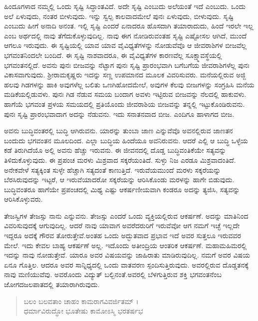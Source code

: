 ಹಿಂದೂಗಳಾದ ನಮ್ಮಲ್ಲಿ ಒಂದು ಸೃಷ್ಟಿ ಸಿದ್ಧಾಂತವಿದೆ. ಅದೇ ಸೃಷ್ಟಿ ಎಂಬುದು ಅಲೆಯಂತೆ ಇದೆ ಎಂಬುದು. ಒಂದು ಅಲೆ ಏಳುವುದು, ನಂತರ ಬೀಳುವುದು. ಇನ್ನು ಸ್ವಲ್ಪ ಕಾಲವಾದಮೇಲೆ ಪುನಃ ಏಳುವುದು, ಬೀಳುವುದು. ಸೃಷ್ಟಿ ಎಂಬುದು ಹೀಗೆ ಅನಾದಿ ಅನಂತ. ಇಲ್ಲಿ ಸೃಷ್ಟಿ ಎಂದರೆ ಏನಾದರೂ ಹೊಸದಾಗಿ ತಯಾರಾದುದು, ಹಿಂದೆ ಇರಲೇ ಇಲ್ಲ ಎಂಬ ಅರ್ಥದಲ್ಲಿ ನಾವು ತೆಗೆದುಕೊಳ್ಳುವುದಿಲ್ಲ. ನಾವು ಈಗ ನೋಡಿರುವಂತಹ ಸೃಷ್ಟಿ ಎಷ್ಟೋಸಲ ಆಗಿದೆ, ಮುಂದೆ ಆಗಲೂ ಇರುವುದು. ಈ ಸೃಷ್ಟಿಯಲ್ಲಿ ಯಾವ ಯಾವ ವೈವಿಧ್ಯತೆಗಳನ್ನು ನೋಡುವೆವೊ ಆ ಜೀವರಾಶಿಗಳ ಬೀಜವೆಲ್ಲ ಭಗವಂತನಿಂದಲೇ ಬಂದಿದೆ. ಈ ಸೃಷ್ಟಿ ನಾಶವಾದರೂ, ಈ ವೈವಿಧ್ಯತೆಗಳ ಕಾರಣವೆಲ್ಲ ಸೂಕ್ಷ್ಮಾವಸ್ಥೆಯಲ್ಲಿ ಭಗವಂತನಲ್ಲಿದೆ. ಅವನು ಪುನಃ ಬೀಜವನ್ನು ನೆಟ್ಟಾಗ ಪುನಃ ಸೃಷ್ಟಿ ಪ್ರಾರಂಭವಾಗಿ ಬಗೆಬಗೆಯ ಜೀವರಾಶಿಗಳೆಲ್ಲ ಪುನಃ ವಿಕಾಸವಾಗುವುದು. ಶ್ರೀರಾಮಕೃಷ್ಣರು ಇದನ್ನು ಸಣ್ಣ ಉಪಮಾನದ ಮೂಲಕ ವಿವರಿಸುವರು. ಮನೆಯಲ್ಲಿರುವ ಅಜ್ಜಿ ಹಲವು ಗಿಡಗಳನ್ನು ಹಾಕಿ ಅವುಗಳೆಲ್ಲ ಬಲಿತು ಒಣಗಿಹೋದಮೇಲೆ, ಅವುಗಳ ಕೆಲವು ಬೀಜಗಳನ್ನು ಸಂಗ್ರಹಿಸಿ ಮನೆಯ ಮಡಿಕೆಯಲ್ಲಿಡುವಳು. ಪುನಃ ಗಿಡ ನೆಡುವ ಸಮಯ ಬಂದಾಗ ಅವಳು ಇಟ್ಟಿರುವ ಬೀಜವನ್ನು ನೆಲದಲ್ಲಿ ಹಾಕುವಳು. ಹಾಗೆಯೆ ಭಗವಂತ ಪ್ರಳಯ ಸಮಯದಲ್ಲಿ ಪ್ರತಿಯೊಂದು ಜೀವರಾಶಿಯ ಬೀಜವನ್ನು ತನ್ನಲ್ಲಿ ಇಟ್ಟುಕೊಂಡಿರುವನು. ಪುನಃ ಸೃಷ್ಟಿ ಪ್ರಾರಂಭವಾದಾಗ ಅದನ್ನು ನೆಡುವನು. ಇದು ಸನಾತನವಾದ ಬೀಜ. ಎಂದಿಗೂ ಹಾಳಾಗದ ಬೀಜ.

ಅವನು ಬುದ್ಧಿವಂತರಲ್ಲಿ ಬುದ್ಧಿ ಆಗಿರುವನು. ಯಾರನ್ನು ತುಂಬಾ ಜಾಣ ಎನ್ನುವೆವೊ ಅವನಲ್ಲಿರುವ ಜಾಣತನ ಬಂದುದು ಭಗವಂತನ ಮೂಲದಿಂದ. ಎಲ್ಲಾ ಬುದ್ಧಿಯ ಹಿಂದೆಯೂ ಅವನಿರುವನು. ಆದರೆ ಎಲ್ಲಿ ಆ ಬುದ್ಧಿ ಒಳ್ಳೆಯ ಕಡೆ ತಿರುಗಿದೆಯೊ ಅಲ್ಲಿ ಅವನು ಹೆಚ್ಚು ಇರುವನು. ಈ ಜೀವನದಲ್ಲಿ ದೊಡ್ಡ ಬುದ್ಧಿವಂತಿಕೆಯೇ ಸತ್ಯವನ್ನು ತಿಳಿದುಕೊಳ್ಳುವುದು. ಈ ಪ್ರಪಂಚ ಮರಳು ಮಿಶ್ರವಾದ ಸಕ್ಕರೆಯಂತಿದೆ. ಸುಳ್ಳು ನಿಜ ಎರಡೂ ಮಿಶ್ರವಾದಂತಿದೆ. ಅನೇಕವೇಳೆ ಸತ್ಯಕ್ಕಿಂತ ಸುಳ್ಳೇ ಹೆಚ್ಚಾಗಿ ಸತ್ಯದಂತೆ ಕಾಣುತ್ತಿದೆ. ಇರುವೆಯಮುಂದೆ ಮರಳು ಸಕ್ಕರೆಯನ್ನು ಬೆರಸಿರುವುದನ್ನು ಇಟ್ಟರೆ, ಆ ಇರುವೆಯಾದರೋ ಸಕ್ಕರೆಯನ್ನು ಆರಿಸಿಕೊಂಡು ಮರಳನ್ನು ಹಾಗೇ ಬಿಡುವುದು. ಬುದ್ಧಿವಂತರೂ ಹಾಗೆಯೇ ಪ್ರಪಂಚದಲ್ಲಿ ಮಿಥ್ಯ ಎಷ್ಟು ಆಕರ್ಷಣೀಯವಾಗಿ ಕಂಡರೂ ಅದನ್ನು ತ್ಯಜಿಸಿ, ಸತ್ಯವನ್ನು ಆರಿಸಿಕೊಳ್ಳುವರು.

ತೇಜಸ್ವಿಗಳ ತೇಜಸ್ಸು ನಾನು ಎನ್ನುವನು. ತೇಜಸ್ಸು ಎಂದರೆ ಒಂದು ವ್ಯಕ್ತಿಯಲ್ಲಿರುವ ಆಕರ್ಷಣೆ. ಅದನ್ನು ಮಾತಿನಿಂದ ವಿವರಿಸುವುದಕ್ಕೆ ಆಗುವುದಿಲ್ಲ. ಆದರೆ ನಾವು ಯಾವಾಗ ಅವರೆದರುರಿಗೆ ಇರುವೆವೋ ಆಗ ನಮಗೆ ಇಚ್ಛೆ ಇಲ್ಲದೇ ಇದ್ದರೂ ಅದಕ್ಕೆ ಗೌರವ ತೋರುತ್ತೇವೆ.ಅಂತಹ ಒಂದು ಅದ್ಭುತವಾದ ಪ್ರಭಾವ ಇದೆ ಅವರ ಸುತ್ತಲೂ ಇರುವವರ ಮೇಲೆ. ಇದು ಕೇವಲ ಬಾಹ್ಯ ಆಕರ್ಷಣೆ ಅಲ್ಲ. ಇದೊಂದು ಅತೀಂದ್ರಿಯ ಆಂತರಿಕ ಆಕರ್ಷಣೆ. ಮಹಾಮಹಿಮರಲ್ಲಿ ಇದನ್ನು ನಾವು ನೋಡುತ್ತೇವೆ. ಯಾರೂ ಅವರ ವಿಷಯವನ್ನು ಜಾಹಿರಾತು ಮಾಡಿರುವುದಿಲ್ಲ. ನಮಗೆ ಅವರ ವಿಷಯ ಏನೂ ಗೊತ್ತಿಲ. ಆದರೂ ಅವರ ಸಾನ್ನಿಧ್ಯದಲ್ಲಿ ಒಂದು ವಾತವರಣ ಸ್ಪಂದಿಸುತ್ತಿರುವುದು. ಅವರಲ್ಲಿರುವ ದೊಡ್ಡತನಕ್ಕೆ ನಾವು ಮಣಿಯುವೆವು. ಅವರೊಂದು ವಿದ್ಯುತ್ ಬಲ್ಬಿನಂತೆ.ಅವರಲ್ಲಿ ಬೆಳಗುತ್ತಿರುವ ಶಕ್ತಿ ಭಗವಂತನೆಂಬ ಜೋಗದಜಲಪಾತದಲ್ಲಿ ತಯಾರಾಗಿರುವುದು.

\begin{verse}
ಬಲಂ ಬಲವತಾಂ ಚಾಹಂ ಕಾಮರಾಗವಿವರ್ಜಿತಮ್ ।\\ಧರ್ಮಾವಿರುದ್ಧೋ ಭೂತೇಷು ಕಾಮೋಽಸ್ಮಿ ಭರತರ್ಷಭ 
\end{verse}

